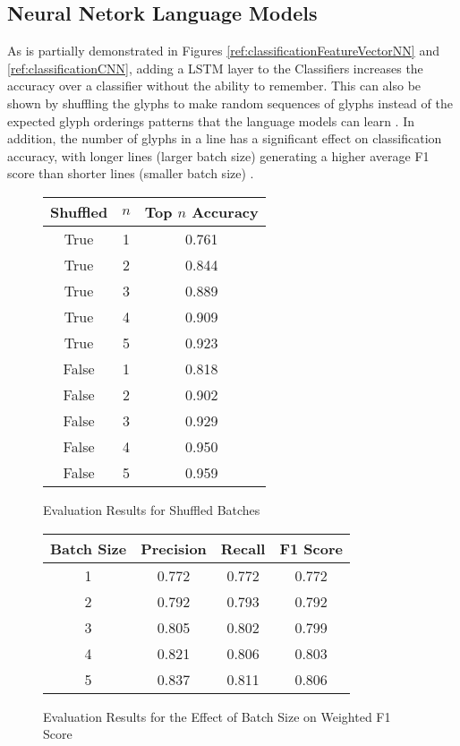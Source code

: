 \subsection{Neural Netork Language Models}

As is partially demonstrated in Figures \ref{ref:classificationFeatureVectorNN} and \ref{ref:classificationCNN}, adding a LSTM layer to the Classifiers increases the accuracy over a classifier without the ability to remember. This can also be shown by shuffling the glyphs to make random sequences of glyphs instead of the expected glyph orderings patterns that the language models can learn . In addition, the number of glyphs in a line has a significant effect on classification accuracy, with longer lines (larger batch size) generating a higher average F1 score than shorter lines (smaller batch size) .

\begin{figure}[H]
    \caption{Evaluation Results for Shuffled Batches}
    \label{fig:classificationShuffle}
    \centering
    \begin{tabular}{ | c | c | c | }
        \hline
        Shuffled & $n$ & Top $n$ Accuracy \\
        \hline
        True & 1 & 0.761 \\
        True & 2 & 0.844 \\
        True & 3 & 0.889 \\
        True & 4 & 0.909 \\
        True & 5 & 0.923 \\
        False & 1 & 0.818 \\
        False & 2 & 0.902 \\
        False & 3 & 0.929 \\
        False & 4 & 0.950 \\
        False & 5 & 0.959 \\
        \hline
    \end{tabular}
\end{figure}

\begin{figure}[H]
    \caption{Evaluation Results for the Effect of Batch Size on Weighted F1 Score}
    \label{fig:classificationBatchSize}
    \centering
    \begin{tabular}{ | c | c | c | c | }
        \hline
        Batch Size & Precision & Recall & F1 Score \\
        \hline
        1 & 0.772 & 0.772 & 0.772 \\
        2 & 0.792 & 0.793 & 0.792 \\
        3 & 0.805 & 0.802 & 0.799 \\
        4 & 0.821 & 0.806 & 0.803 \\
        5 & 0.837 & 0.811 & 0.806 \\
        \hline
    \end{tabular}
\end{figure}

